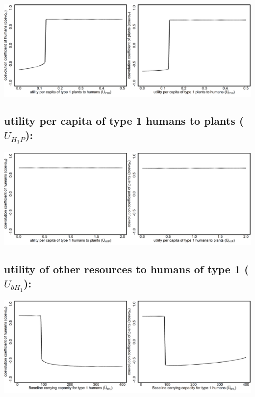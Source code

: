 \documentclass[
]{book}
\begin{document}
\includegraphics[width=1\linewidth]{plots/2_exp_utility_per_capita_type_1_plants_to_humans_bifurcationPlotPair}

\hypertarget{utility-per-capita-of-type-1-humans-to-plants-baru_h_1p}{%
\subsection{\texorpdfstring{utility per capita \textbf{of} type 1 humans \textbf{to} plants (\(\bar{U}_{H_{1}P}\)):}{utility per capita of type 1 humans to plants (\textbackslash bar\{U\}\_\{H\_\{1\}P\}):}}\label{utility-per-capita-of-type-1-humans-to-plants-baru_h_1p}}

\includegraphics[width=1\linewidth]{plots/2_exp_utility_per_capita_type_1_humans_to_plants_bifurcationPlotPair}

\hypertarget{utility-of-other-resources-to-humans-of-type-1-u_bh_1}{%
\subsection{\texorpdfstring{utility \textbf{of} other resources \textbf{to} humans of type 1 (\(U_{bH_{1}}\)):}{utility of other resources to humans of type 1 (U\_\{bH\_\{1\}\}):}}\label{utility-of-other-resources-to-humans-of-type-1-u_bh_1}}

\includegraphics[width=1\linewidth]{plots/2_exp_utility_other_to_type_1_humans_bifurcationPlotPair}
\end{document}
